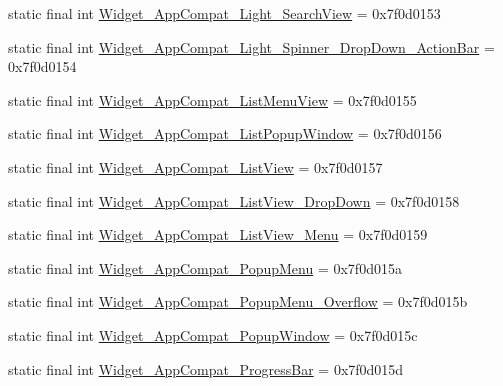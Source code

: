 \begin{DoxyCompactItemize}
\item 
static final int \mbox{\hyperlink{classandroid_1_1support_1_1design_1_1_r_1_1style_a58e29240634e52dc3816876687bd0209}{Widget\+\_\+\+App\+Compat\+\_\+\+Light\+\_\+\+Search\+View}} = 0x7f0d0153
\item 
static final int \mbox{\hyperlink{classandroid_1_1support_1_1design_1_1_r_1_1style_a7a4fe1246deb189632a33f6311618b8e}{Widget\+\_\+\+App\+Compat\+\_\+\+Light\+\_\+\+Spinner\+\_\+\+Drop\+Down\+\_\+\+Action\+Bar}} = 0x7f0d0154
\item 
static final int \mbox{\hyperlink{classandroid_1_1support_1_1design_1_1_r_1_1style_a60b1d73b99766ec4be47a24851e4c72c}{Widget\+\_\+\+App\+Compat\+\_\+\+List\+Menu\+View}} = 0x7f0d0155
\item 
static final int \mbox{\hyperlink{classandroid_1_1support_1_1design_1_1_r_1_1style_ad8f90fca8c6fe4f82764d8c71e26cc9e}{Widget\+\_\+\+App\+Compat\+\_\+\+List\+Popup\+Window}} = 0x7f0d0156
\item 
static final int \mbox{\hyperlink{classandroid_1_1support_1_1design_1_1_r_1_1style_a9ccf0592624b31bfc316c13457666037}{Widget\+\_\+\+App\+Compat\+\_\+\+List\+View}} = 0x7f0d0157
\item 
static final int \mbox{\hyperlink{classandroid_1_1support_1_1design_1_1_r_1_1style_ab67dfc2e7a77263ca823b0590eda7828}{Widget\+\_\+\+App\+Compat\+\_\+\+List\+View\+\_\+\+Drop\+Down}} = 0x7f0d0158
\item 
static final int \mbox{\hyperlink{classandroid_1_1support_1_1design_1_1_r_1_1style_aa09a8e109ec40dc7c46cc3840732d1f8}{Widget\+\_\+\+App\+Compat\+\_\+\+List\+View\+\_\+\+Menu}} = 0x7f0d0159
\item 
static final int \mbox{\hyperlink{classandroid_1_1support_1_1design_1_1_r_1_1style_a5be61913be313ee9343c327d6a484a45}{Widget\+\_\+\+App\+Compat\+\_\+\+Popup\+Menu}} = 0x7f0d015a
\item 
static final int \mbox{\hyperlink{classandroid_1_1support_1_1design_1_1_r_1_1style_a575cc5a614049c69898d8e1cdc96eed5}{Widget\+\_\+\+App\+Compat\+\_\+\+Popup\+Menu\+\_\+\+Overflow}} = 0x7f0d015b
\item 
static final int \mbox{\hyperlink{classandroid_1_1support_1_1design_1_1_r_1_1style_ad01cd09f11b7b01c4e2e498efaf849f4}{Widget\+\_\+\+App\+Compat\+\_\+\+Popup\+Window}} = 0x7f0d015c
\item 
static final int \mbox{\hyperlink{classandroid_1_1support_1_1design_1_1_r_1_1style_a5ec9d21fb8b380e4d5dd750b5c18154a}{Widget\+\_\+\+App\+Compat\+\_\+\+Progress\+Bar}} = 0x7f0d015d
\item 

\end{DoxyCompactItemize}
